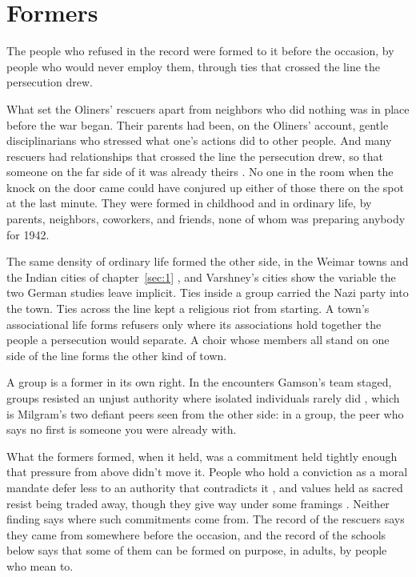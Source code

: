 \section{Formers}
\label{sec:reproduced.formers}
The people who refused in the record were formed to it before the occasion, by people who would never employ them, through ties that crossed the line the persecution drew.

What set the Oliners' rescuers apart from neighbors who did nothing was in place before the war began. Their parents had been, on the Oliners' account, gentle disciplinarians who stressed what one's actions did to other people. And many rescuers had relationships that crossed the line the persecution drew, so that someone on the far side of it was already theirs \autocite{oliner1988altruistic}. No one in the room when the knock on the door came could have conjured up either of those there on the spot at the last minute. They were formed in childhood and in ordinary life, by parents, neighbors, coworkers, and friends, none of whom was preparing anybody for 1942.

The same density of ordinary life formed the other side, in the Weimar towns and the Indian cities of chapter~\ref{sec:1} \autocite{berman1997weimar,satyanath2017bowling,varshney2002ethnic}, and Varshney's cities show the variable the two German studies leave implicit. Ties inside a group carried the Nazi party into the town. Ties across the line kept a religious riot from starting. A town's associational life forms refusers only where its associations hold together the people a persecution would separate. A choir whose members all stand on one side of the line forms the other kind of town.

A group is a former in its own right. In the encounters Gamson's team staged, groups resisted an unjust authority where isolated individuals rarely did \autocite{gamson1982encounters}, which is Milgram's two defiant peers seen from the other side: in a group, the peer who says no first is someone you were already with.

What the formers formed, when it held, was a commitment held tightly enough that pressure from above didn't move it. People who hold a conviction as a moral mandate defer less to an authority that contradicts it \autocite{skitka2009limits}, and values held as sacred resist being traded away, though they give way under some framings \autocite{ginges2007sacred}. Neither finding says where such commitments come from. The record of the rescuers says they came from somewhere before the occasion, and the record of the schools below says that some of them can be formed on purpose, in adults, by people who mean to.

